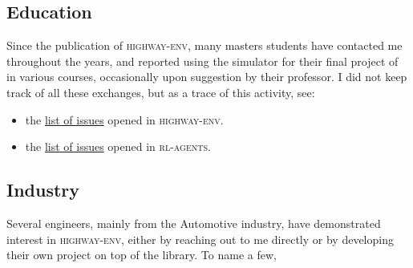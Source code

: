 \subsection{Education}

Since the publication of \textsc{highway-env}, many masters students have contacted me throughout the years, and reported using the simulator for their final project of in various courses, occasionally upon suggestion by their professor. %
I did not keep track of all these exchanges, but as a trace of this activity, see:
\begin{itemize}
	\item the \href{https://github.com/eleurent/highway-env/issues?q=is\%3Aissue}{list of issues} opened in \textsc{highway-env}.
	\item the \href{https://github.com/eleurent/rl-agents/issues?q=is\%3Aissue}{list of issues} opened in \textsc{rl-agents}.
\end{itemize} 

\subsection{Industry}

Several engineers, mainly from the Automotive industry, have demonstrated interest in \textsc{highway-env}, either by reaching out to me directly or by developing their own project on top of the library. To name a few,

